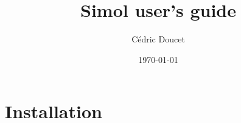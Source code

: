 \documentclass[12pt]{book}
\title{Simol user's guide}
\author{C\'edric Doucet}
\date{\today}
\begin{document}
\maketitle


\chapter{Installation}
\end{document}
